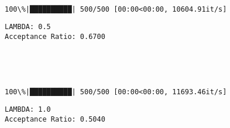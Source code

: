 \documentclass[11pt]{article}
\begin{document}
    \begin{center}
    \end{center}
    { \hspace*{\fill} \\}
    
    \begin{Verbatim}[commandchars=\\\{\}]
100\%|██████████| 500/500 [00:00<00:00, 10604.91it/s]
    \end{Verbatim}

    \begin{Verbatim}[commandchars=\\\{\}]
LAMBDA: 0.5
Acceptance Ratio: 0.6700

    \end{Verbatim}

    \begin{Verbatim}[commandchars=\\\{\}]


    \end{Verbatim}

    \begin{center}
    \end{center}
    { \hspace*{\fill} \\}
    
    \begin{Verbatim}[commandchars=\\\{\}]
100\%|██████████| 500/500 [00:00<00:00, 11693.46it/s]
    \end{Verbatim}

    \begin{Verbatim}[commandchars=\\\{\}]
LAMBDA: 1.0
Acceptance Ratio: 0.5040

    \end{Verbatim}

    \begin{Verbatim}[commandchars=\\\{\}]


    \end{Verbatim}

    \begin{center}
    \end{center}
    { \hspace*{\fill} \\}
    
\end{document}
